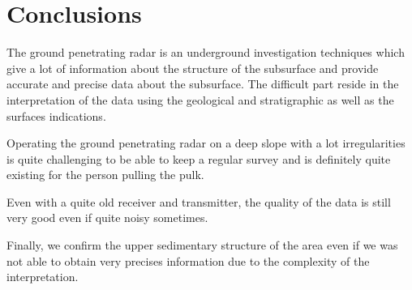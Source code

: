 \newpage
\section{Conclusions}

The ground penetrating radar is an underground investigation techniques which give a lot of information about the structure of the subsurface and provide accurate and precise data about the subsurface. The difficult part reside in the interpretation of the data using the geological and stratigraphic as well as the surfaces indications.

Operating the ground penetrating radar on a deep slope with a lot irregularities is quite challenging to be able to keep a regular survey and is definitely quite existing for the person pulling the pulk.

Even with a quite old receiver and transmitter, the quality of the data is still very good even if quite noisy sometimes.

Finally, we confirm the upper sedimentary structure of the area even if we was not able to obtain very precises information due to the complexity of the interpretation.


